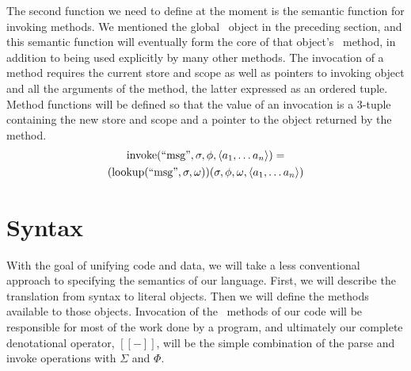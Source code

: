 \documentclass[twocolumn]{article}
\begin{document}
The second function we need to define at the moment is the semantic
function for invoking methods. We mentioned the global \msg\ object in
the preceding section, and this semantic function will eventually form
the core of that object's \call\ method, in addition to being used
explicitly by many other methods. The invocation of a method requires
the current store and scope as well as pointers to invoking object and
all the arguments of the method, the latter expressed as an ordered
tuple. Method functions will be defined so that the value of an
invocation is a 3-tuple containing the new store and scope and a
pointer to the object returned by the method.
\begin{multline*}
  \operatorname{invoke}( \text{``msg''}, \sigma, \phi, \left< a_1,\ldots a_n\right>) = \\
  (\operatorname{lookup}(\text{``msg''}, \sigma, \omega))(\sigma,\phi,\omega,
  \left< a_1,\ldots a_n \right> )
\end{multline*}
  
\section*{Syntax}

With the goal of unifying code and data, we will take a less
conventional approach to specifying the semantics of our
language. First, we will describe the translation from syntax to
literal objects. Then we will define the methods available to those
objects. Invocation of the \eval\ methods of our code will be
responsible for most of the work done by a program, and ultimately our
complete denotational operator, $[\![-]\!]$, will be the simple
combination of the parse and invoke operations with $\Sigma$ and
$\Phi$.
\end{document}
